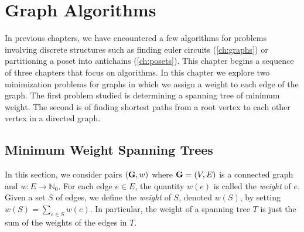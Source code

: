 
\chapter{Graph Algorithms}\label{ch:graphalgorithms}

In previous chapters, we have encountered a few algorithms for
problems involving discrete structures such as finding euler circuits
(\autoref{ch:graphs}) or partitioning a poset into antichains
(\autoref{ch:posets}). This chapter begins a sequence of three
chapters that focus on algorithms. In this chapter we explore two
minimization problems for graphs in which we assign a weight to each
edge of the graph. The first problem studied is determining a spanning
tree of minimum weight. The second is of finding shortest paths from
a root vertex to each other vertex in a directed graph.

\section{Minimum Weight Spanning Trees}

In this section, we consider pairs $(\mathbf{G},w)$ where $\mathbf{G}=(V,E)$ is a
connected graph and $w:E\rightarrow\mathbb{N}_0$. For each edge $e\in
E$, the quantity $w(e)$ is called the \textit{weight} of $e$.  Given a
set $S$ of edges, we define the \textit{weight} of $S$, denoted
$w(S)$, by setting $w(S)=\sum_{e\in S} w(e)$. In particular, the
weight of a spanning tree $T$ is just the sum of the weights of the
edges in $T$.

